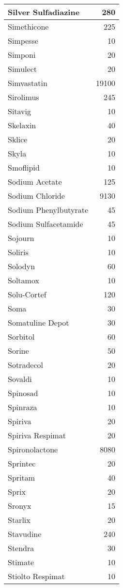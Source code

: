\documentclass[
]{article}
\begin{document}
\begin{table}
\begin{tabular}[t]{l|r}
Silver Sulfadiazine & 280\\
\hline
Simethicone & 225\\
\hline
Simpesse & 10\\
\hline
Simponi & 20\\
\hline
Simulect & 20\\
\hline
Simvastatin & 19100\\
\hline
Sirolimus & 245\\
\hline
Sitavig & 10\\
\hline
Skelaxin & 40\\
\hline
Sklice & 20\\
\hline
Skyla & 10\\
\hline
Smoflipid & 10\\
\hline
Sodium Acetate & 125\\
\hline
Sodium Chloride & 9130\\
\hline
Sodium Phenylbutyrate & 45\\
\hline
Sodium Sulfacetamide & 45\\
\hline
Sojourn & 10\\
\hline
Soliris & 10\\
\hline
Solodyn & 60\\
\hline
Soltamox & 10\\
\hline
Solu-Cortef & 120\\
\hline
Soma & 30\\
\hline
Somatuline Depot & 30\\
\hline
Sorbitol & 60\\
\hline
Sorine & 50\\
\hline
Sotradecol & 20\\
\hline
Sovaldi & 10\\
\hline
Spinosad & 10\\
\hline
Spinraza & 10\\
\hline
Spiriva & 20\\
\hline
Spiriva Respimat & 20\\
\hline
Spironolactone & 8080\\
\hline
Sprintec & 20\\
\hline
Spritam & 40\\
\hline
Sprix & 20\\
\hline
Sronyx & 15\\
\hline
Starlix & 20\\
\hline
Stavudine & 240\\
\hline
Stendra & 30\\
\hline
Stimate & 10\\
\hline
Stiolto Respimat & 10\\

\end{tabular}
\end{table}
\end{document}
